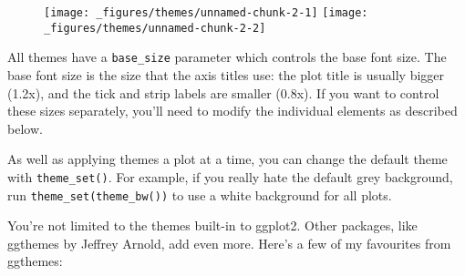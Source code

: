 \begin{Shaded}
\begin{Highlighting}[]
\StringTok{ }\NormalTok{() +}\StringTok{ }\NormalTok{(}\NormalTok{)}
\StringTok{ }\NormalTok{() +}\StringTok{ }\NormalTok{(}\NormalTok{)}
\end{Highlighting}
\end{Shaded}

\begin{figure}[H]
  \texttt{[image: \_figures/themes/unnamed-chunk-2-1]}%
  \texttt{[image: \_figures/themes/unnamed-chunk-2-2]}
\end{figure}

All themes have a \texttt{base\_size} parameter which controls the base
font size. The base font size is the size that the axis titles use: the
plot title is usually bigger (1.2x), and the tick and strip labels are
smaller (0.8x). If you want to control these sizes separately, you'll
need to modify the individual elements as described below.

As well as applying themes a plot at a time, you can change the default
theme with \texttt{theme\_set()}. For example, if you really hate the
default grey background, run \texttt{theme\_set(theme\_bw())} to use a
white background for all plots. 

You're not limited to the themes built-in to ggplot2. Other packages,
like ggthemes by Jeffrey Arnold, add even more. Here's a few of my
favourites from ggthemes: 

\begin{Shaded}
\begin{Highlighting}[]
\StringTok{ }\NormalTok{() +}\StringTok{ }\NormalTok{(}\NormalTok{)}
\StringTok{ }\NormalTok{() +}\StringTok{ }\NormalTok{(}\NormalTok{)}
\StringTok{ }\NormalTok{() +}\StringTok{ }\NormalTok{(}\NormalTok{) }\CommentTok{# ;)}
\end{Highlighting}
\end{Shaded}

